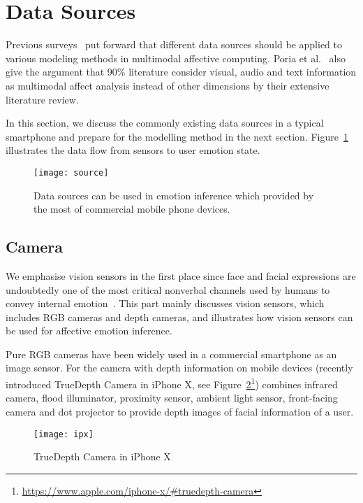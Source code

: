 \section{Data Sources}\label{sec:source}

Previous surveys~\cite{Tao2005, Zhang2014, Poria2017, Garcia2017} put forward that different data sources should be applied to various modeling methods in multimodal affective computing. Poria et al.~\cite{Poria2017} also give the argument that 90\% literature consider visual, audio and text information as multimodal affect analysis instead of other dimensions by their extensive literature review.

In this section, we discuss the commonly existing data sources in a typical smartphone and prepare for the modelling method in the next section. Figure~\ref{fig:source} illustrates the data flow from sensors to user emotion state.

\begin{figure}
    \centering
    \texttt{[image: source]}
    \caption{Data sources can be used in emotion inference which provided by the most of commercial mobile phone devices.}
    \label{fig:source}
\end{figure}

\subsection{Camera}\label{subsec:vision}
We emphasise vision sensors in the first place since face and facial expressions are undoubtedly one of the most critical nonverbal channels used by humans to convey internal emotion~\cite{james2013emotion, Poria2017}. This part mainly discusses vision sensors, which includes RGB cameras and depth cameras, and illustrates how vision sensors can be used for affective emotion inference.

Pure RGB cameras have been widely used in a commercial smartphone as an image sensor. 
For the camera with depth information on mobile devices (recently introduced TrueDepth Camera in iPhone X, see Figure~\ref{fig:ipx}\footnote{\url{https://www.apple.com/iphone-x/\#truedepth-camera}}) combines infrared camera, flood illuminator, proximity sensor, ambient light sensor, front-facing camera and dot projector to provide depth images of facial information of a user.

\begin{figure}
    \centering
    \label{fig:ipx}
    \texttt{[image: ipx]}
    \caption{TrueDepth Camera in iPhone X}
\end{figure}

